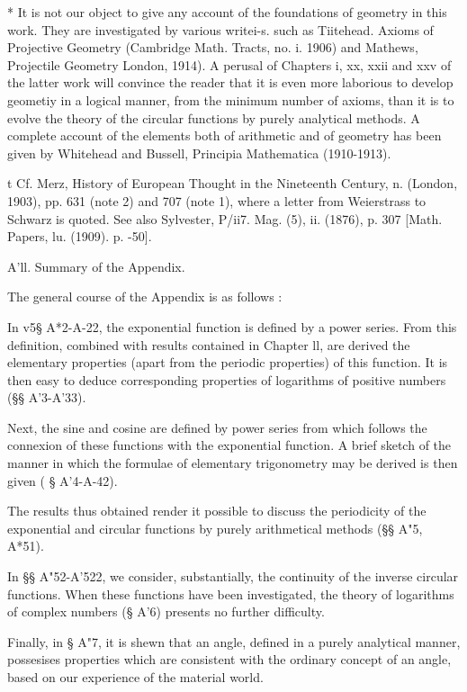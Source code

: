* It is not our object to give any account of the foundations of
geometry in this work. They are investigated by various writei-s. such
as Tiitehead. Axioms of Projective Geometry (Cambridge Math. Tracts,
no. i. 1906) and Mathews, Projectile Geometry London, 1914). A perusal
of Chapters i, xx, xxii and xxv of the latter work will convince the
reader that it is even more laborious to develop geometiy in a logical
manner, from the minimum number of axioms, than it is to evolve the
theory of the circular functions by purely analytical methods. A
complete account of the elements both of arithmetic and of geometry
has been given by Whitehead and Bussell, Principia Mathematica
(1910-1913).

t Cf. Merz, History of European Thought in the Nineteenth Century, n.
(London, 1903), pp. 631 (note 2) and 707 (note 1), where a letter from
Weierstrass to Schwarz is quoted. See also Sylvester, P/ii7. Mag. (5),
ii. (1876), p. 307 [Math. Papers, lu. (1909). p. -50].

%
%

A'll. Summary of the Appendix.

The general course of the Appendix is as follows :

In v5§ A*2-A-22, the exponential function is defined by a power
series. From this definition, combined with results contained in
Chapter ll, are derived the elementary properties (apart from the
periodic properties) of this function. It is then easy to deduce
corresponding properties of logarithms of positive numbers (§§
A'3-A'33).

Next, the sine and cosine are defined by power series from which
follows the connexion of these functions with the exponential
function. A brief sketch of the manner in which the formulae of
elementary trigonometry may be derived is then given ( § A'4-A-42).

The results thus obtained render it possible to discuss the
periodicity of the exponential and circular functions by purely
arithmetical methods (§§ A"5, A*51).

In §§ A"52-A'522, we consider, substantially, the continuity of the
inverse circular functions. When these functions have been
investigated, the theory of logarithms of complex numbers (§ A'6)
presents no further difficulty.

Finally, in § A"7, it is shewn that an angle, defined in a purely
analytical manner, possesises properties which are consistent with the
ordinary concept of an angle, based on our experience of the material
world.

